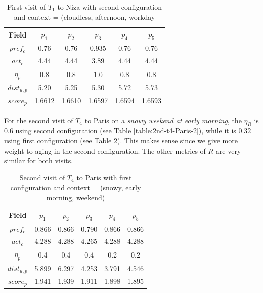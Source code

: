 \begin{table}[h!]
    \centering
        \caption{First visit of $T_1$ to Niza with second configuration and context = (cloudless,  afternoon, workday}
    \label{table:2nd-t1-niza-1}
    \begin{tabular}{ |c|c|c|c|c|c| } 
        \hline
        Field   & $p_1$ & $p_2$ & $p_3$ & $p_4$ & $p_5$ \\
        \hline
        $pref_c$    &  0.76 & 0.76 & 0.935 & 0.76 & 0.76 \\
        $act_c$     & 4.44 & 4.44 & 3.89 & 4.44 & 4.44  \\
        $\eta_p$    & 0.8 & 0.8 & 1.0 & 0.8 & 0.8 \\
        $dist_{u,p}$ & 5.20 & 5.25 & 5.30 & 5.72 & 5.73 \\
        $score_p$    & 1.6612 & 1.6610 & 1.6597 & 1.6594 & 1.6593 \\
        
        \hline
    \end{tabular}
\end{table}

For the second visit of $T_4$ to Paris on a {\it snowy weekend at early morning}, the $\eta_R$ is $0.6$ using second configuration (see Table \ref{table:2nd-t4-Paris-2}), while it is $0.32$ using first configuration (see Table \ref{table:1st-t4-Paris-2}). This makes sense since we give more weight to aging in the second configuration. The other metrics of $R$ are very similar for both visits.

\begin{table}[h!]
    \centering
        \caption{Second visit of $T_4$ to Paris with first configuration and context = (snowy, early morning, weekend)}
    \label{table:1st-t4-Paris-2}
    \begin{tabular}{ |c|c|c|c|c|c| } 
        \hline
        Field   & $p_1$ & $p_2$ & $p_3$ & $p_4$ & $p_5$ \\
        \hline
        $pref_c$    &  0.866 & 0.866 & 0.790 & 0.866 & 0.866 \\
        $act_c$     & 4.288 & 4.288 & 4.265 & 4.288 & 4.288  \\
        $\eta_p$    & 0.4 & 0.4 & 0.4 & 0.2 & 0.2 \\
        $dist_{u,p}$ & 5.899 & 6.297 & 4.253 & 3.791 & 4.546 \\
        $score_p$    & 1.941 & 1.939 & 1.911 & 1.898 & 1.895 \\
        
        \hline
    \end{tabular}
\end{table}

